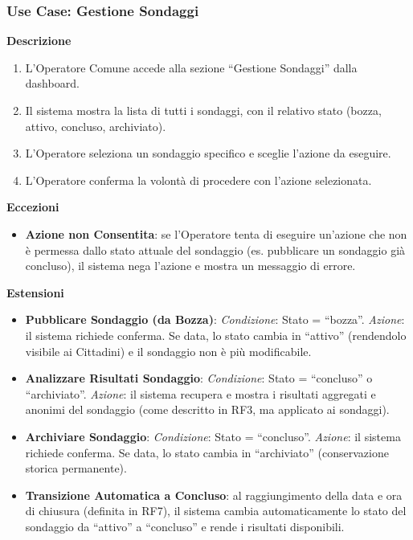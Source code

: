 \documentclass{article}
\begin{document}
\subsubsection*{Use Case: Gestione Sondaggi}

\textbf{Descrizione}
\begin{enumerate}
    \item L'Operatore Comune accede alla sezione ``Gestione Sondaggi'' dalla dashboard.
    \item Il sistema mostra la lista di tutti i sondaggi, con il relativo stato (bozza, attivo, concluso, archiviato).
    \item L'Operatore seleziona un sondaggio specifico e sceglie l'azione da eseguire.
    \item L'Operatore conferma la volontà di procedere con l'azione selezionata.
\end{enumerate}

\textbf{Eccezioni}
\begin{itemize}
    \item \textbf{Azione non Consentita}: se l'Operatore tenta di eseguire un'azione che non è permessa dallo stato attuale del sondaggio (es. pubblicare un sondaggio già concluso), il sistema nega l'azione e mostra un messaggio di errore.
\end{itemize}

\textbf{Estensioni}
\begin{itemize}
    \item \textbf{Pubblicare Sondaggio (da Bozza)}: \textit{Condizione}: Stato = ``bozza''. \textit{Azione}: il sistema richiede conferma. Se data, lo stato cambia in ``attivo'' (rendendolo visibile ai Cittadini) e il sondaggio non è più modificabile.
    \item \textbf{Analizzare Risultati Sondaggio}: \textit{Condizione}: Stato = ``concluso'' o ``archiviato''. \textit{Azione}: il sistema recupera e mostra i risultati aggregati e anonimi del sondaggio (come descritto in RF3, ma applicato ai sondaggi).
    \item \textbf{Archiviare Sondaggio}: \textit{Condizione}: Stato = ``concluso''. \textit{Azione}: il sistema richiede conferma. Se data, lo stato cambia in ``archiviato'' (conservazione storica permanente).
    \item \textbf{Transizione Automatica a Concluso}: al raggiungimento della data e ora di chiusura (definita in RF7), il sistema cambia automaticamente lo stato del sondaggio da ``attivo'' a ``concluso'' e rende i risultati disponibili.
\end{itemize}
\end{document}

